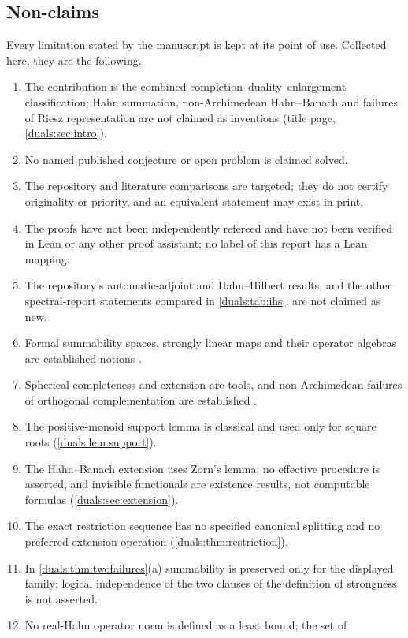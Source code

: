 \documentclass[11pt,letterpaper]{article}
\numberwithin{equation}{section}
\theoremstyle{definition}
\theoremstyle{remark}
\begin{document}
\subsection{Non-claims}
Every limitation stated by the manuscript is kept at its point of use.
Collected here, they are the following.
\begin{enumerate}
\item The contribution is the combined completion--duality--enlargement
 classification; Hahn summation, non-Archimedean Hahn--Banach and failures
 of Riesz representation are not claimed as inventions (title page,
 \cref{duals:sec:intro}).
\item No named published conjecture or open problem is claimed solved.
\item The repository and literature comparisons are targeted; they do not
 certify originality or priority, and an equivalent statement may exist
 in print.
\item The proofs have not been independently refereed and have not been
 verified in Lean or any other proof assistant; no label of this report
 has a Lean mapping.
\item The repository's automatic-adjoint and Hahn--Hilbert results, and the
 other spectral-report statements compared in \cref{duals:tab:ihs}, are not
 claimed as new.
\item Formal summability spaces, strongly linear maps and their operator
 algebras are established notions \cite{BKKPS}.
\item Spherical completeness and extension are tools, and non-Archimedean
 failures of orthogonal complementation are established \cite{AN}.
\item The positive-monoid support lemma is classical and used only for
 square roots (\cref{duals:lem:support}).
\item The Hahn--Banach extension uses Zorn's lemma; no effective procedure
 is asserted, and invisible functionals are existence results, not
 computable formulas (\cref{duals:sec:extension}).
\item The exact restriction sequence has no specified canonical splitting
 and no preferred extension operation (\cref{duals:thm:restriction}).
\item In \cref{duals:thm:twofailures}(a) summability is preserved only for
 the displayed family; logical independence of the two clauses of the
 definition of strongness is not asserted.
\item No real-Hahn operator norm is defined as a least bound; the set of

\end{enumerate}
\end{document}
